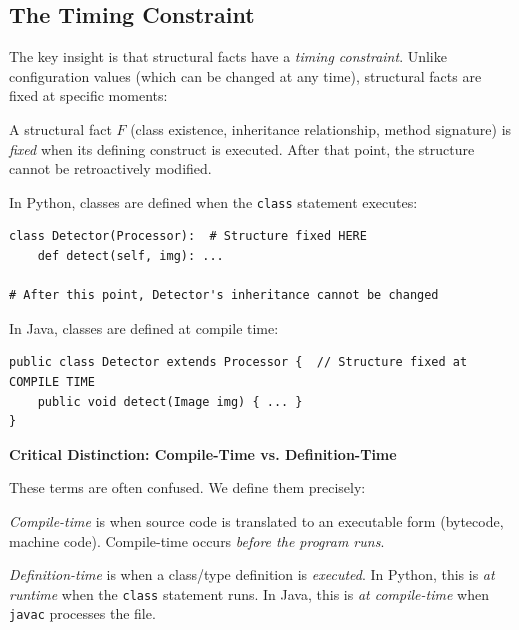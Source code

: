 \subsection{The Timing Constraint}\label{sec:timing}

The key insight is that structural facts have a \emph{timing constraint}. Unlike configuration values (which can be changed at any time), structural facts are fixed at specific moments:

\begin{definition}\label{def:structural-timing}
A structural fact $F$ (class existence, inheritance relationship, method signature) is \emph{fixed} when its defining construct is executed. After that point, the structure cannot be retroactively modified.
\end{definition}

In Python, classes are defined when the \texttt{class} statement executes:

\begin{verbatim}
class Detector(Processor):  # Structure fixed HERE
    def detect(self, img): ...

# After this point, Detector's inheritance cannot be changed
\end{verbatim}

In Java, classes are defined at compile time:

\begin{verbatim}
public class Detector extends Processor {  // Structure fixed at COMPILE TIME
    public void detect(Image img) { ... }
}
\end{verbatim}

\textbf{Critical Distinction: Compile-Time vs. Definition-Time}

These terms are often confused. We define them precisely:

\begin{definition}\label{def:compile-time}
\emph{Compile-time} is when source code is translated to an executable form (bytecode, machine code). Compile-time occurs \emph{before the program runs}.
\end{definition}

\begin{definition}\label{def:definition-time}
\emph{Definition-time} is when a class/type definition is \emph{executed}. In Python, this is \emph{at runtime} when the \texttt{class} statement runs. In Java, this is \emph{at compile-time} when \texttt{javac} processes the file.
\end{definition}

